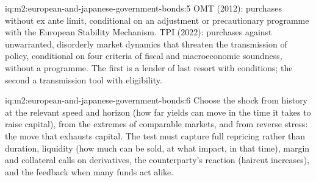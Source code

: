 \begin{solution}{iq:m2:european-and-japanese-government-bonds:5}
OMT (2012): purchases without ex ante limit, conditional on an adjustment or
precautionary programme with the European Stability Mechanism. TPI (2022):
purchases against unwarranted, disorderly market dynamics that threaten the
transmission of policy, conditional on four criteria of fiscal and
macroeconomic soundness, without a programme. The first is a lender of last
resort with conditions; the second a transmission tool with eligibility.
\end{solution}

\begin{solution}{iq:m2:european-and-japanese-government-bonds:6}
Choose the shock from history at the relevant speed and horizon (how far
yields can move in the time it takes to raise capital), from the extremes of
comparable markets, and from reverse stress: the move that exhausts capital.
The test must capture full repricing rather than duration, liquidity (how much
can be sold, at what impact, in that time), margin and collateral calls on
derivatives, the counterparty's reaction (haircut increases), and the
feedback when many funds act alike.
\end{solution}
